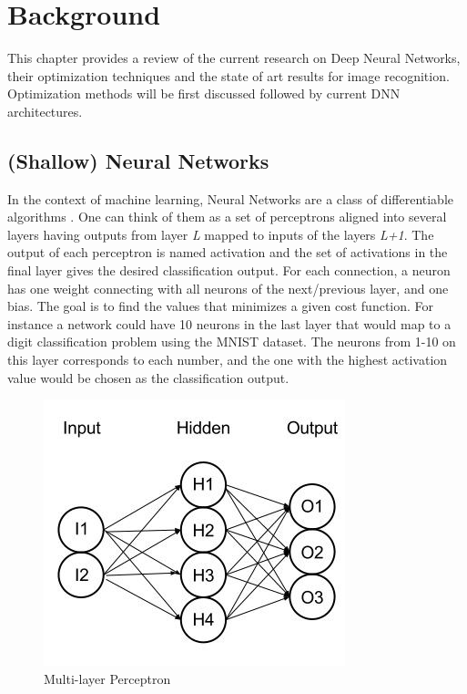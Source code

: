 \chapter{Background}

This chapter provides a review of the current research on Deep Neural Networks, their optimization techniques and the state of art results for image recognition. Optimization methods will be first discussed followed by current DNN architectures.

\section{ (Shallow) Neural Networks}

In the context of machine learning, Neural Networks are a class of differentiable algorithms \cite{bishop1995neural}. One can think of them as a set of perceptrons aligned into several layers having outputs from layer \textit{L} mapped to inputs of the layers \textit{L+1}. The output of each perceptron is named activation and the set of activations in the final layer gives the desired classification output. For each connection, a neuron has one weight connecting with all neurons of the next/previous layer, and one bias. The goal is to find the values that minimizes a given cost function. For instance a network could have 10 neurons in the last layer that would map to a digit classification problem using the MNIST \cite{lecun1998mnist} dataset. The neurons from 1-10 on this layer corresponds to each number, and the one with the highest activation value would be chosen as the classification output.

\begin{figure}[h!]
\centering
	\includegraphics[scale=0.5]{mlnet.png}
\caption{Multi-layer Perceptron}
\label{fig:mlnet}
\end{figure}


